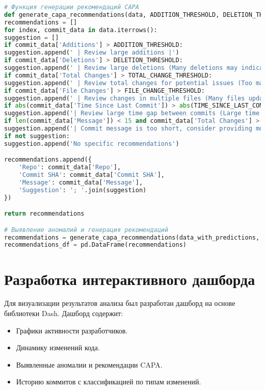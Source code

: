 \begin{lstlisting}[language=Python]
# Функция генерации рекомендаций CAPA
def generate_capa_recommendations(data, ADDITION_THRESHOLD, DELETION_THRESHOLD, TOTAL_CHANGE_THRESHOLD, FILE_CHANGE_THRESHOLD, TIME_SINCE_LAST_COMMIT_THRESHOLD):
recommendations = []
for index, commit_data in data.iterrows():
suggestion = []
if commit_data['Additions'] > ADDITION_THRESHOLD:
suggestion.append(' | Review large additions |')
if commit_data['Deletions'] > DELETION_THRESHOLD:
suggestion.append(' | Review large deletions (Many deletions may indicate a fix) |')
if commit_data['Total Changes'] > TOTAL_CHANGE_THRESHOLD:
suggestion.append(' | Review total changes for potential issues (Too many changes since last commit) |')
if commit_data['File Changes'] > FILE_CHANGE_THRESHOLD:
suggestion.append(' | Review changes in multiple files (Many files updated, expected compatibility issues) |')
if abs(commit_data['Time Since Last Commit']) > abs(TIME_SINCE_LAST_COMMIT_THRESHOLD):
suggestion.append('| Review large time gap between commits (Large time gap between commits may indicate a slow development process) |')
if len(commit_data['Message']) < 15 and commit_data['Total Changes'] > TOTAL_CHANGE_THRESHOLD:
suggestion.append('| Commit message is too short, consider providing more details |')
if not suggestion:
suggestion.append('No specific recommendations')

recommendations.append({
	'Repo': commit_data['Repo'],
	'Commit SHA': commit_data['Commit SHA'],
	'Message': commit_data['Message'],
	'Suggestion': '; '.join(suggestion)
})

return recommendations

# Выявление аномалий и генерация рекомендаций
recommendations = generate_capa_recommendations(data_with_predictions, ADDITION_THRESHOLD, DELETION_THRESHOLD, TOTAL_CHANGE_THRESHOLD, FILE_CHANGE_THRESHOLD, TIME_SINCE_LAST_COMMIT_THRESHOLD)
recommendations_df = pd.DataFrame(recommendations)
\end{lstlisting}

\section{Разработка интерактивного дашборда} \label{ch3:sec5}

Для визуализации результатов анализа был разработан дашборд на основе библиотеки Dash. Дашборд содержит:
\begin{itemize}
	\item Графики активности разработчиков.
	\item Динамику изменений кода.
	\item Выявленные аномалии и рекомендации CAPA.
	\item Историю коммитов с классификацией по типам изменений.
\end{itemize}

